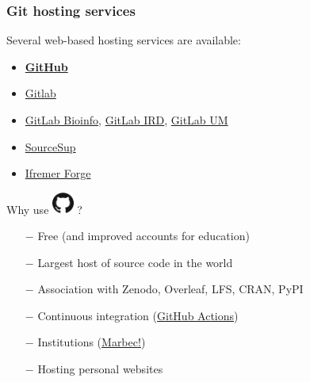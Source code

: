 \documentclass[svgnames]{beamer}
\begin{document}
\begin{frame}
\frametitle{Git hosting services}

Several web-based hosting services are available:

\begin{itemize}
\item \textbf{\href{https://github.com/}{GitHub}}
\item \href{https://gitlab.com/}{Gitlab}
\item{\href{https://gitlab-bioinfo.ird.fr/}{GitLab Bioinfo}, 
\href{https://gitlab-bioinfo.ird.fr/}{GitLab IRD},
\href{https://gitlab.mbb.univ-montp2.fr/}{GitLab UM}
}
\item \href{https://sourcesup.renater.fr/}{SourceSup}
\item \href{https://forge.ifremer.fr/}{Ifremer Forge}


\end{itemize}

Why use \includegraphics[height=20pt]{img/GitHub-Mark-120px-plus.png}  ?
\begin{itemize}
\item[$-$]{Free (and improved accounts for education)}
\item[$-$]{Largest host of source code in the world}
\item[$-$]{Association with Zenodo, Overleaf, LFS, CRAN, PyPI}
\item[$-$]{Continuous integration (\href{https://github.com/features/actions}{GitHub Actions})}
\item[$-$]{Institutions (\href{https://github.com/umr-marbec}{Marbec!})}
\item[$-$]{Hosting personal websites}
\end{itemize}

\end{frame}
\end{document}
